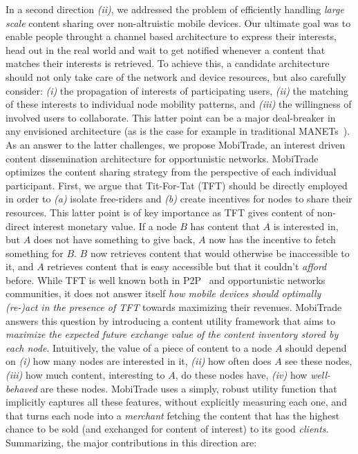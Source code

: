 In a second direction \emph{(ii)}, we addressed the problem of efficiently handling \emph{large scale} content sharing over non-altruistic mobile devices. Our ultimate goal was to enable people throught a channel based architecture to express their interests, head out in the real world and wait to get notified whenever a content that matches their interests is retrieved. To achieve this, a candidate architecture should not only take care of the network and device resources, but also carefully consider: \emph{(i)} the propagation of interests of participating users, \emph{(ii)} the matching of these interests to individual node mobility patterns, and \emph{(iii)} the willingness of involved users to collaborate. This latter point can be a major deal-breaker in any envisioned architecture (as is the case for example in traditional MANETs~\cite{NashEquilibria}). As an answer to the latter challenges, we propose MobiTrade, an interest driven content dissemination architecture for opportunistic networks. MobiTrade optimizes the content sharing strategy from the perspective of each individual participant. First, we argue that Tit-For-Tat (TFT) should be directly employed in order to \emph{(a)} isolate free-riders and \emph{(b)} create incentives for nodes to share their resources. This latter point is of key importance as TFT gives content of non-direct interest monetary value. If a node $B$ has content that $A$ is interested in, but $A$ does not have something to give back, $A$ now has the incentive to fetch something for $B$. $B$ now retrieves content that would otherwise be inaccessible to it, and $A$ retrieves content that is easy accessible but that it couldn't \emph{afford} before. While TFT is well known both in P2P~\cite{BitHoc} and opportunistic networks~\cite{BarterDTN} communities, it does not answer itself \emph{how mobile devices should optimally (re-)act in the presence of TFT} towards maximizing their revenues. MobiTrade answers this question by introducing a content utility framework that aims to \emph{maximize the expected future exchange value of the content inventory stored by each node}. Intuitively, the value of a piece of content to a node $A$ should depend on \emph{(i)} how many nodes are interested in it, \emph{(ii)} how often does $A$ see these nodes, \emph{(iii)} how much content, interesting to $A$, do these nodes have, \emph{(iv)} how \emph{well-behaved} are these nodes. MobiTrade uses a simply, robust utility function that implicitly captures all these features, without explicitly measuring each one, and that turns each node into a \emph{merchant} fetching the content that has the highest chance to be sold (and exchanged for content of interest) to its good \emph{clients}. Summarizing, the major contributions in this direction are:

